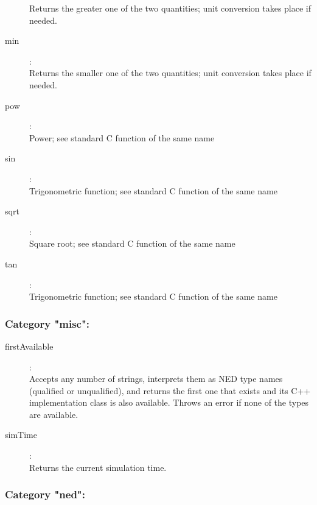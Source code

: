 \begin{description}
    Returns the greater one of the two quantities; unit conversion takes place if needed.
\item[min]:  \\
    Returns the smaller one of the two quantities; unit conversion takes place if needed.
\item[pow]:  \\
    Power; see standard C function of the same name
\item[sin]:  \\
    Trigonometric function; see standard C function of the same name
\item[sqrt]:  \\
    Square root; see standard C function of the same name
\item[tan]:  \\
    Trigonometric function; see standard C function of the same name

\end{description}

\subsubsection{Category "misc":}

\begin{description}
\item[firstAvailable]:  \\
    Accepts any number of strings, interprets them as NED type names (qualified or unqualified), and returns the first one that exists and its C++ implementation class is also available. Throws an error if none of the types are available.
\item[simTime]:  \\
    Returns the current simulation time.

\end{description}

\subsubsection{Category "ned":}

